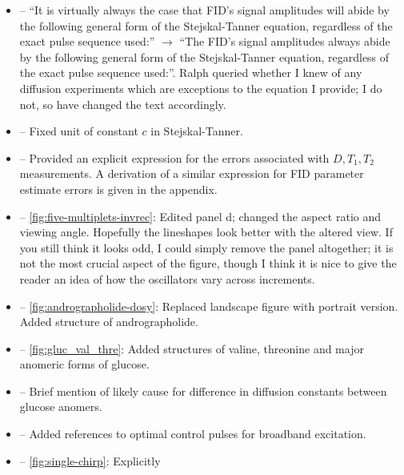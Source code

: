 \documentclass[12pt]{article}
\begin{document}
\begin{itemize}
       \item {} -- ``It is virtually always the case
           that FID’s signal amplitudes will abide by the following general
           form of the Stejskal-Tanner equation, regardless of the exact pulse
           sequence used:'' $\rightarrow$
            ``The \ac{FID}'s signal amplitudes always abide by the following general form
            of the Stejskal-Tanner equation, regardless of the exact pulse sequence
            used:''.
            Ralph queried whether I knew of any diffusion experiments which are
            exceptions to the equation I provide; I do not, so have changed the
            text accordingly.
        \item {} -- Fixed unit of constant $c$ in
            Stejskal-Tanner.
        \item {} -- Provided an explicit expression for
            the errors associated with $D, T_1, T_2$ measurements.
            A derivation of a similar expression for FID parameter estimate
            errors is given in the appendix.
        \item {} -- \cref{fig:five-multiplets-invrec}:
            Edited panel d; changed the aspect ratio and viewing angle.
            Hopefully the lineshapes look better with the altered view. If you
            still think it looks odd, I could simply remove the panel
            altogether; it is not the most crucial aspect of the figure, though
            I think it is nice to give the reader an idea of how the
            oscillators vary across increments.
        \item {} -- \cref{fig:andrographolide-dosy}:
            Replaced landscape figure with portrait version. Added structure of
            andrographolide.
        \item {} -- \cref{fig:gluc_val_thre}: Added
            structures of valine, threonine and major anomeric forms of glucose.
        \item {} -- Brief mention of likely cause for
            difference in diffusion constants between glucose anomers.
        \item {} -- Added references to optimal
            control pulses for broadband excitation.
        \item {} -- \cref{fig:single-chirp}: Explicitly

\end{itemize}
\end{document}

